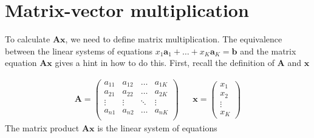 \documentclass[
]{book}
\theoremstyle{definition}
\theoremstyle{definition}
\theoremstyle{definition}
\theoremstyle{definition}
\theoremstyle{remark}
\begin{document}
\hypertarget{matrix-vector-multiplication}{%
\section{Matrix-vector multiplication}\label{matrix-vector-multiplication}}

To calculate \(\mathbf{A} \mathbf{x}\), we need to define matrix multiplication. The equivalence between the linear systems of equations \(x_1 \mathbf{a}_1 + \ldots + x_K \mathbf{a}_K = \mathbf{b}\) and the matrix equation \(\mathbf{A} \mathbf{x}\) gives a hint in how to do this. First, recall the definition of \(\mathbf{A}\) and \(\mathbf{x}\)

\[
\begin{aligned}
\mathbf{A} = \begin{pmatrix}
a_{11} & a_{12} & \ldots & a_{1K} \\
a_{21} & a_{22} & \ldots & a_{2K} \\
\vdots & \vdots & \ddots & \vdots \\
a_{n1} & a_{n2} & \ldots & a_{nK} \\
\end{pmatrix} && \mathbf{x} = \begin{pmatrix} x_1 \\ x_2 \\ \vdots \\ x_K \end{pmatrix}
\end{aligned}
\]
The matrix product \(\mathbf{A}\mathbf{x}\) is the linear system of equations
\end{document}
